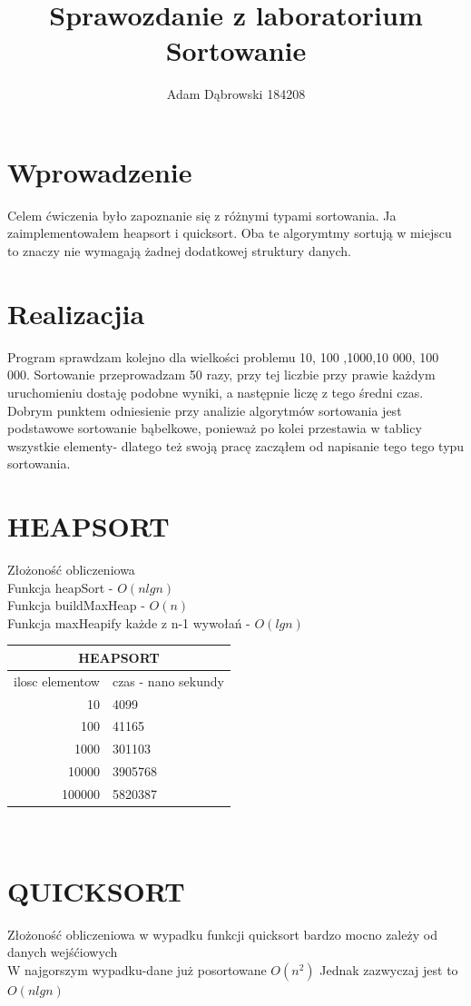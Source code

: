 \documentclass[a4paper,11pt]{report}
\title{\textbf{Sprawozdanie z laboratorium\\Sortowanie}}
\author{Adam Dąbrowski 184208}
\begin{document}
\maketitle
\section{Wprowadzenie}

Celem ćwiczenia było zapoznanie się z różnymi typami sortowania. Ja zaimplementowałem heapsort i quicksort. Oba te algorymtmy sortują w miejscu to znaczy nie wymagają żadnej dodatkowej struktury danych.  

\section{Realizacjia}

Program sprawdzam kolejno dla wielkości problemu 10, 100 ,1000,10 000, 100 000. Sortowanie przeprowadzam 50 razy, przy tej liczbie przy prawie każdym uruchomieniu dostaję podobne wyniki, a następnie liczę z tego średni czas. Dobrym punktem odniesienie przy analizie algorytmów sortowania jest podstawowe sortowanie bąbelkowe, ponieważ po kolei przestawia w tablicy wszystkie elementy- dlatego też swoją pracę zacząłem od napisanie tego tego typu sortowania. 
\section{HEAPSORT}

Złożoność obliczeniowa\\
Funkcja heapSort - $O(nlgn)$\\  
Funkcja buildMaxHeap - $O(n)$\\
Funkcja maxHeapify każde z n-1 wywołań - $O(lgn)$\\
\begin{tabular}{|rl|}
\hline
\multicolumn{2}{|c|}{HEAPSORT}\\
\hline
ilosc elementow & czas - nano sekundy\\
\hline
10&4099\\
100&41165\\
1000&301103\\
10000&3905768\\
100000&5820387\\
\hline
\end{tabular}
\\
\section{QUICKSORT}
Złożoność obliczeniowa w wypadku funkcji quicksort bardzo mocno zależy od danych wejśćiowych\\ 
W najgorszym wypadku-dane już posortowane $O(n^{2})$
Jednak zazwyczaj jest to $O(n lgn)$
  
\end{document}
